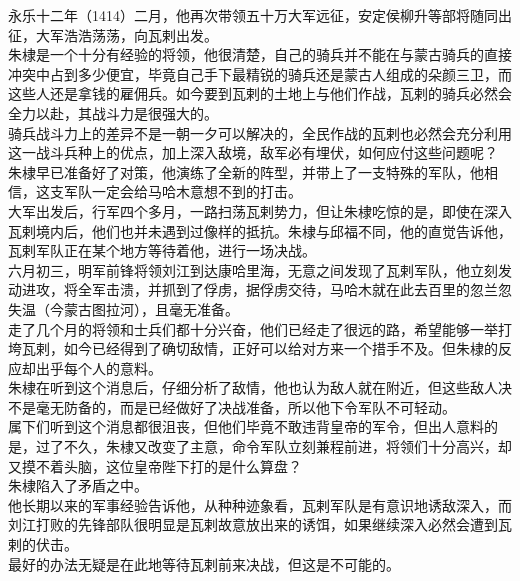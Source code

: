 \begin{multicols}{\theparacolNo}
永乐十二年（1414）二月，他再次带领五十万大军远征，安定侯柳升等部将随同出征，大军浩浩荡荡，向瓦剌出发。\\

朱棣是一个十分有经验的将领，他很清楚，自己的骑兵并不能在与蒙古骑兵的直接冲突中占到多少便宜，毕竟自己手下最精锐的骑兵还是蒙古人组成的朵颜三卫，而这些人还是拿钱的雇佣兵。如今要到瓦剌的土地上与他们作战，瓦剌的骑兵必然会全力以赴，其战斗力是很强大的。\\

骑兵战斗力上的差异不是一朝一夕可以解决的，全民作战的瓦剌也必然会充分利用这一战斗兵种上的优点，加上深入敌境，敌军必有埋伏，如何应付这些问题呢？\\

朱棣早已准备好了对策，他演练了全新的阵型，并带上了一支特殊的军队，他相信，这支军队一定会给马哈木意想不到的打击。\\

大军出发后，行军四个多月，一路扫荡瓦剌势力，但让朱棣吃惊的是，即使在深入瓦剌境内后，他们也并未遇到过像样的抵抗。朱棣与邱福不同，他的直觉告诉他，瓦剌军队正在某个地方等待着他，进行一场决战。\\

六月初三，明军前锋将领刘江到达康哈里海，无意之间发现了瓦剌军队，他立刻发动进攻，将全军击溃，并抓到了俘虏，据俘虏交待，马哈木就在此去百里的忽兰忽失温（今蒙古图拉河），且毫无准备。\\

走了几个月的将领和士兵们都十分兴奋，他们已经走了很远的路，希望能够一举打垮瓦剌，如今已经得到了确切敌情，正好可以给对方来一个措手不及。但朱棣的反应却出乎每个人的意料。\\

朱棣在听到这个消息后，仔细分析了敌情，他也认为敌人就在附近，但这些敌人决不是毫无防备的，而是已经做好了决战准备，所以他下令军队不可轻动。\\

属下们听到这个消息都很沮丧，但他们毕竟不敢违背皇帝的军令，但出人意料的是，过了不久，朱棣又改变了主意，命令军队立刻兼程前进，将领们十分高兴，却又摸不着头脑，这位皇帝陛下打的是什么算盘？\\

朱棣陷入了矛盾之中。\\

他长期以来的军事经验告诉他，从种种迹象看，瓦剌军队是有意识地诱敌深入，而刘江打败的先锋部队很明显是瓦剌故意放出来的诱饵，如果继续深入必然会遭到瓦剌的伏击。\\

最好的办法无疑是在此地等待瓦剌前来决战，但这是不可能的。\\


\end{multicols}
